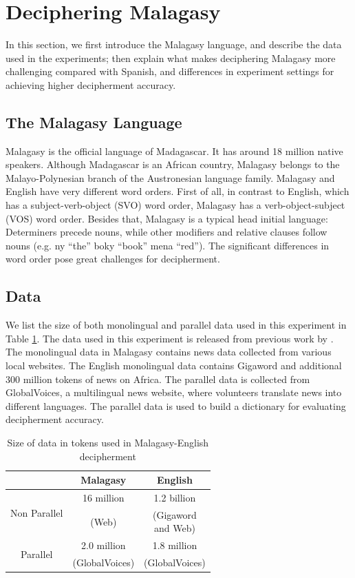 \section{Deciphering Malagasy}
\label{decipher_malagasy}
In this section, we first introduce the Malagasy language, and describe the data used in the experiments; then explain what makes deciphering Malagasy more challenging compared with Spanish, and differences in experiment settings for achieving higher decipherment accuracy.

\subsection{The Malagasy Language}
Malagasy is the official language of Madagascar. It has around 18 million native speakers. Although Madagascar is an African country, Malagasy belongs to the Malayo-Polynesian branch of the Austronesian language family. Malagasy and English have very different word orders. First of all, in contrast to English, which has a subject-verb-object (SVO) word order, Malagasy has a verb-object-subject (VOS) word order. Besides that, Malagasy is a typical head initial language: Determiners precede nouns, while other modifiers and relative clauses follow nouns (e.g. ny ``the'' boky ``book'' mena ``red''). The significant differences in word order pose great challenges for decipherment.


\subsection{Data}
We list the size of both monolingual and parallel data used in this experiment in Table \ref{mlg-en-data}. The data used in this experiment is released from previous work by . The monolingual data in Malagasy contains news data collected from various local websites. The English monolingual data contains Gigaword and additional 300 million tokens of news on Africa. The parallel data is collected from GlobalVoices, a multilingual news website, where volunteers translate news into different languages. The parallel data is used to build a dictionary for evaluating decipherment accuracy. 

 \begin{table}
 \begin{center}
 \begin{tabular}{ |c|c|c| } \hline
             & Malagasy & English \\ \hline
\multirow{2}{*}{Non Parallel} & 16 million & 1.2 billion\\ 
& (Web) & \pbox{2cm}{ (Gigaword \\ and Web)}  \\ \hline
\multirow{2}{*}{Parallel} & 2.0 million& 1.8 million \\
 & (GlobalVoices) & (GlobalVoices)  \\ \hline
 \end{tabular}
 \caption{Size of data in tokens used in Malagasy-English decipherment}
 \label{mlg-en-data}
 \end{center}
 \end{table}
 
